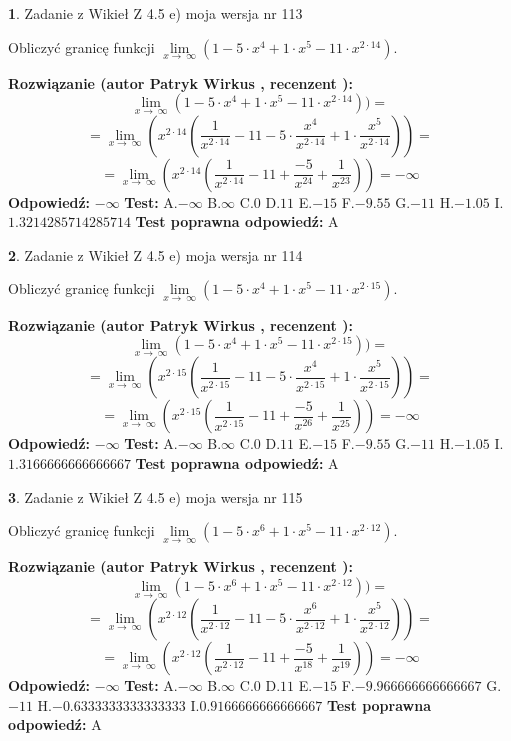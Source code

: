 \documentclass[12pt, a4paper]{article}
\theoremstyle{definition} %
\newtheorem{zad}{}
\newcommand{\zadStart}[1]{\begin{zad}#1\newline}
\newcommand{\zadStop}{\end{zad}}
\newcommand{\rozwStart}[2]{\noindent \textbf{Rozwiązanie (autor #1 , recenzent #2): }\newline}
\newcommand{\rozwStop}{\newline}
\newcommand{\odpStart}{\noindent \textbf{Odpowiedź:}\newline}
\newcommand{\odpStop}{\newline}
\newcommand{\testStart}{\noindent \textbf{Test:}\newline}
\newcommand{\testStop}{\newline}
\newcommand{\kluczStart}{\noindent \textbf{Test poprawna odpowiedź:}\newline}
\newcommand{\kluczStop}{\newline}
\begin{document}
\zadStart{Zadanie z Wikieł Z 4.5 e) moja wersja nr 113}


Obliczyć granicę funkcji  $\lim\limits_{x\to\ \infty}(1 - 5 \cdot x^{4}+1 \cdot x^{5}- 11 \cdot x^{2\cdot14})$.
\zadStop
\rozwStart{Patryk Wirkus}{}
$$\lim\limits_{x\to\ \infty}(1 - 5 \cdot x^{4}+1 \cdot x^{5}- 11 \cdot x^{2\cdot14}))=$$
$$=\lim\limits_{x\to\ \infty}(x^{2\cdot14}(\frac{1}{x^{2\cdot14}}-11 -5 \cdot \frac{x^{4}}{x^{2\cdot14}}+1 \cdot \frac{x^{5}}{x^{2\cdot14}}))=$$
$$=\lim\limits_{x\to\ \infty}(x^{2\cdot14}(\frac{1}{x^{2\cdot14}}-11 + \frac{-5}{x^{24}}+ \frac{1}{x^{23}}))=-\infty$$
\rozwStop
\odpStart
$-\infty$
\odpStop
\testStart
A.$-\infty$ B.$\infty$ C.$0$ D.$11$ E.$-15$
F.$-9.55$ G.$-11$
H.$-1.05$
I.$1.3214285714285714$
\testStop
\kluczStart
A
\kluczStop



\zadStart{Zadanie z Wikieł Z 4.5 e) moja wersja nr 114}


Obliczyć granicę funkcji  $\lim\limits_{x\to\ \infty}(1 - 5 \cdot x^{4}+1 \cdot x^{5}- 11 \cdot x^{2\cdot15})$.
\zadStop
\rozwStart{Patryk Wirkus}{}
$$\lim\limits_{x\to\ \infty}(1 - 5 \cdot x^{4}+1 \cdot x^{5}- 11 \cdot x^{2\cdot15}))=$$
$$=\lim\limits_{x\to\ \infty}(x^{2\cdot15}(\frac{1}{x^{2\cdot15}}-11 -5 \cdot \frac{x^{4}}{x^{2\cdot15}}+1 \cdot \frac{x^{5}}{x^{2\cdot15}}))=$$
$$=\lim\limits_{x\to\ \infty}(x^{2\cdot15}(\frac{1}{x^{2\cdot15}}-11 + \frac{-5}{x^{26}}+ \frac{1}{x^{25}}))=-\infty$$
\rozwStop
\odpStart
$-\infty$
\odpStop
\testStart
A.$-\infty$ B.$\infty$ C.$0$ D.$11$ E.$-15$
F.$-9.55$ G.$-11$
H.$-1.05$
I.$1.3166666666666667$
\testStop
\kluczStart
A
\kluczStop



\zadStart{Zadanie z Wikieł Z 4.5 e) moja wersja nr 115}


Obliczyć granicę funkcji  $\lim\limits_{x\to\ \infty}(1 - 5 \cdot x^{6}+1 \cdot x^{5}- 11 \cdot x^{2\cdot12})$.
\zadStop
\rozwStart{Patryk Wirkus}{}
$$\lim\limits_{x\to\ \infty}(1 - 5 \cdot x^{6}+1 \cdot x^{5}- 11 \cdot x^{2\cdot12}))=$$
$$=\lim\limits_{x\to\ \infty}(x^{2\cdot12}(\frac{1}{x^{2\cdot12}}-11 -5 \cdot \frac{x^{6}}{x^{2\cdot12}}+1 \cdot \frac{x^{5}}{x^{2\cdot12}}))=$$
$$=\lim\limits_{x\to\ \infty}(x^{2\cdot12}(\frac{1}{x^{2\cdot12}}-11 + \frac{-5}{x^{18}}+ \frac{1}{x^{19}}))=-\infty$$
\rozwStop
\odpStart
$-\infty$
\odpStop
\testStart
A.$-\infty$ B.$\infty$ C.$0$ D.$11$ E.$-15$
F.$-9.966666666666667$ G.$-11$
H.$-0.6333333333333333$
I.$0.9166666666666667$
\testStop
\kluczStart
A
\kluczStop
\end{document}
